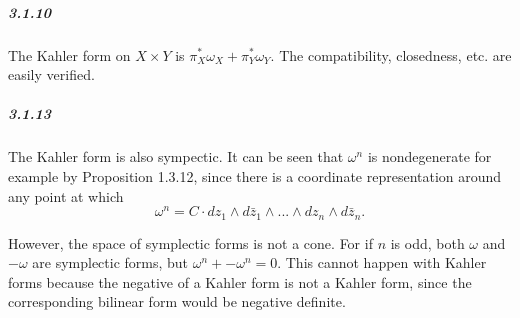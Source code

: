 \documentclass[10pt,letter]{article}
\begin{document}
\subparagraph{3.1.10} The Kahler form on $X \times Y$ is $\pi_{X}^{\ast} \omega_X + \pi_{Y}^{\ast}\omega_Y$. The compatibility, closedness, etc. are easily verified.

\subparagraph{3.1.13} The Kahler form is also sympectic. It can be seen that $\omega^n$ is nondegenerate for example by Proposition 1.3.12, since there is a coordinate representation around any point at which \[ \omega^n = C\cdot dz_1 \wedge d\bar{z}_1 \wedge ... \wedge dz_n \wedge d\bar{z}_n.\] 

However, the space of symplectic forms is not a cone. For if $n$ is odd, both $\omega$ and $-\omega$ are symplectic forms, but $\omega^n + -\omega^n = 0$. This cannot happen with Kahler forms because the negative of a Kahler form is not a Kahler form, since the corresponding bilinear form would be negative definite.
\end{document}
